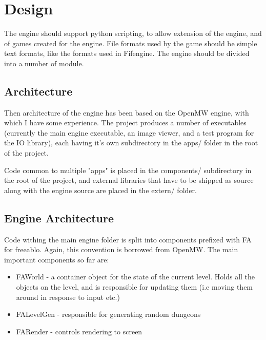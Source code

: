   \chapter{Design}
    The engine should support python scripting, to allow extension of the engine, and of games created for the engine.
    File formats used by the game should be simple text formats, like the formats used in Fifengine.
    The engine should be divided into a number of module.
    
    \section{Architecture}
    Then architecture of the engine has been based on the OpenMW\cite{openmw} engine, with which I have some experience.
    The project produces a number of executables (currently the main engine executable, an image viewer, and a test program for the IO library), each having it's own subdirectory in the apps/ folder in the root of the project.
    
    Code common to multiple "apps" is placed in the components/ subdirectory in the root of the project, and external libraries that have to be shipped as source along with the engine source are placed in the extern/ folder.
    
    \section{Engine Architecture}
    Code withing the main engine folder is split into components prefixed with FA for freeablo. Again, this convention is borrowed from OpenMW\cite{openmw}.
    The main important components so far are:
    \begin{itemize}
        \item{FAWorld - a container object for the state of the current level. Holds all the objects on the level, and is responsible for updating them (i.e moving them around in response to input etc.)}
        \item{FALevelGen - responsible for generating random dungeons}
        \item{FARender - controls rendering to screen}
    \end{itemize}
